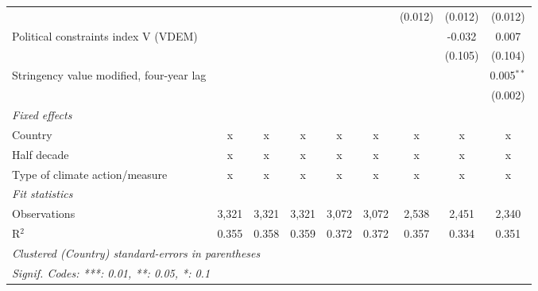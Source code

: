 \begin{tabular}{lcccccccc}
                                                      &              &               &               &               &               & (0.012)       & (0.012)      & (0.012)\\   
   Political constraints index V (VDEM)               &              &               &               &               &               &               & -0.032       & 0.007\\   
                                                      &              &               &               &               &               &               & (0.105)      & (0.104)\\   
   Stringency value modified, four-year lag           &              &               &               &               &               &               &              & 0.005$^{**}$\\   
                                                      &              &               &               &               &               &               &              & (0.002)\\   
   \emph{Fixed effects}\\
   Country                                            & x            & x             & x             & x             & x             & x             & x            & x\\  
   Half decade                                        & x            & x             & x             & x             & x             & x             & x            & x\\  
   Type of climate action/measure                     & x            & x             & x             & x             & x             & x             & x            & x\\  
   \midrule \emph{Fit statistics}\\
   Observations                                       & 3,321        & 3,321         & 3,321         & 3,072         & 3,072         & 2,538         & 2,451        & 2,340\\  
   R$^2$                                              & 0.355        & 0.358         & 0.359         & 0.372         & 0.372         & 0.357         & 0.334        & 0.351\\  
   \midrule
   \multicolumn{9}{l}{\emph{Clustered (Country) standard-errors in parentheses}}\\
   \multicolumn{9}{l}{\emph{Signif. Codes: ***: 0.01, **: 0.05, *: 0.1}}\\
\end{tabular}
\par\endgroup


